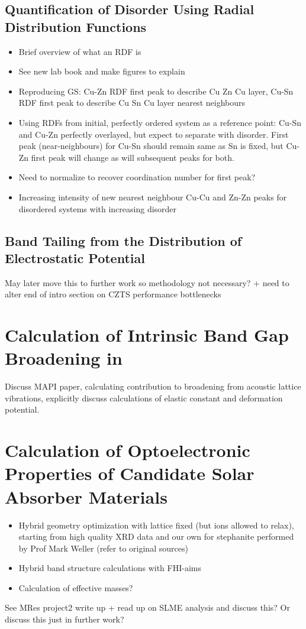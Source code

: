 \subsection{Quantification of Disorder Using Radial Distribution Functions}\label{RDF_methods}
\begin{itemize}
\item Brief overview of what an RDF is
\item See new lab book and make figures to explain
\item Reproducing GS: Cu-Zn RDF first peak to describe Cu Zn Cu layer, Cu-Sn RDF first peak to describe Cu Sn Cu layer nearest neighbours
\item Using RDFs from initial, perfectly ordered system as a reference point: Cu-Sn and Cu-Zn perfectly overlayed, but expect to separate with disorder. First peak (near-neighbours) for Cu-Sn should remain same as Sn is fixed, but Cu-Zn first peak will change as will subsequent peaks for both.
\item Need to normalize to recover coordination number for first peak?
\item Increasing intensity of new nearest neighbour Cu-Cu and Zn-Zn peaks for disordered systems with increasing disorder
\end{itemize}


\subsection{Band Tailing from the Distribution of Electrostatic Potential}
May later move this to further work so methodology not necessary? + need to alter end of intro section on CZTS performance bottlenecks




\section{Calculation of Intrinsic Band Gap Broadening in \CZTS}
Discuss MAPI paper, calculating contribution to broadening from acoustic lattice vibrations, explicitly discuss calculations of elastic constant and deformation potential.


\section{Calculation of Optoelectronic Properties of Candidate Solar Absorber Materials}\label{properties_methods}
\begin{itemize}
\item Hybrid geometry optimization with lattice fixed (but ions allowed to relax), starting from high quality XRD data and our own for stephanite performed by Prof Mark Weller (refer to original sources)
\item Hybrid band structure calculations with FHI-aims
\item Calculation of effective masses?
\end{itemize}

See MRes project2 write up + read up on SLME analysis and discuss this? Or discuss this just in further work?

                            